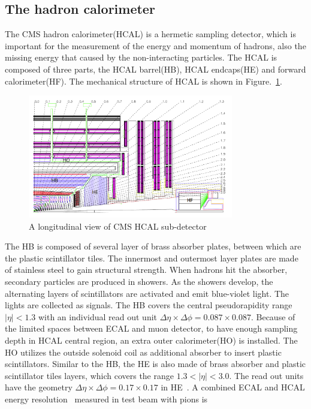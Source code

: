 \subsection{The hadron calorimeter}

The CMS hadron calorimeter(HCAL) is a hermetic sampling detector, which is important for the measurement of the energy and momentum of hadrons, also the missing energy that caused by the non-interacting particles.  The HCAL is composed of three parts, the HCAL barrel(HB), HCAL endcaps(HE) and forward calorimeter(HF). The mechanical structure of HCAL is shown in Figure.~\ref{fig:HCALL_sketch}. 

\begin{figure}[htbp] 
\centering
\includegraphics[width=0.8\textwidth]{chapter3/HCAL_sketch.png}
\caption{A longitudinal view of CMS HCAL sub-detector~\cite{CMS_experiment}}
\label{fig:HCALL_sketch}
\end{figure}


The HB is composed of  several layer of brass absorber plates, between which are the plastic scintillator tiles. The innermost and outermost layer plates are made of stainless steel to gain structural strength. When hadrons hit the absorber, secondary particles are produced in showers. As the showers develop, the alternating layers of scintillators are activated and emit blue-violet light. The lights are collected as signals. The HB covers the central pseudorapidity range $|\eta|<1.3$ with an individual read out unit $\Delta \eta\times\Delta\phi=0.087\times 0.087$. Because of the limited spaces between ECAL and muon detector, to have enough sampling depth in HCAL central region, an extra outer calorimeter(HO) is installed. The HO utilizes the outside solenoid coil as additional absorber to insert plastic scintillators. Similar to the HB, the HE is also made of brass absorber and plastic scintillator tiles layers, which covers the range $1.3<|\eta|<3.0$. The read out units have the geometry $\Delta \eta\times\Delta\phi=0.17\times 0.17$ in HE~\cite{CMS_experiment}. A combined ECAL and HCAL energy resolution~\cite{HCAL_reso} measured in test beam with pions is 

